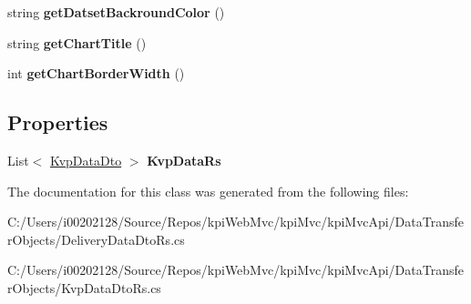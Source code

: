 \begin{DoxyCompactItemize}
string {\bfseries get\+Datset\+Backround\+Color} ()
\item 
\mbox{\label{classkpi_mvc_api_1_1_data_transfer_objects_1_1_kvp_data_dto_rs_ac1a9b5ca7012ddd12549e157929f23e7}} 
string {\bfseries get\+Chart\+Title} ()
\item 
\mbox{\label{classkpi_mvc_api_1_1_data_transfer_objects_1_1_kvp_data_dto_rs_afcb6b42bf6a7f8271efc95f671bc9e08}} 
int {\bfseries get\+Chart\+Border\+Width} ()
\end{DoxyCompactItemize}
\subsection*{Properties}
\begin{DoxyCompactItemize}
\item 
\mbox{\label{classkpi_mvc_api_1_1_data_transfer_objects_1_1_kvp_data_dto_rs_ae32122a6aba038291afde6128898487e}} 
List$<$ \hyperlink{classkpi_mvc_api_1_1_data_transfer_objects_1_1_kvp_data_dto}{Kvp\+Data\+Dto} $>$ {\bfseries Kvp\+Data\+Rs}
\end{DoxyCompactItemize}


The documentation for this class was generated from the following files\+:\begin{DoxyCompactItemize}
\item 
C\+:/\+Users/i00202128/\+Source/\+Repos/kpi\+Web\+Mvc/kpi\+Mvc/kpi\+Mvc\+Api/\+Data\+Transfer\+Objects/Delivery\+Data\+Dto\+Rs.\+cs\item 
C\+:/\+Users/i00202128/\+Source/\+Repos/kpi\+Web\+Mvc/kpi\+Mvc/kpi\+Mvc\+Api/\+Data\+Transfer\+Objects/Kvp\+Data\+Dto\+Rs.\+cs\end{DoxyCompactItemize}

